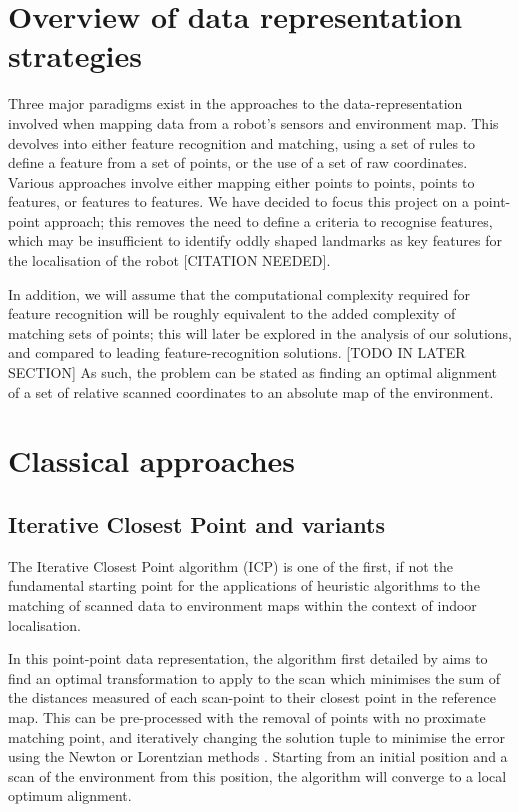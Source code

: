 \documentclass[authoryearcitations]{UoYCSproject}
\begin{document}
\section{Overview of data representation strategies}
Three major paradigms exist in the approaches to the data-representation involved when mapping data from a robot's sensors and environment map. This devolves into either feature recognition and matching, using a set of rules to define a feature from a set of points, or the use of a set of raw coordinates. Various approaches involve either mapping either points to points, points to features, or features to features. We have decided to focus this project on a point-point approach; this removes the need to define a criteria to recognise features, which may be insufficient to identify oddly shaped landmarks as key features for the localisation of the robot [CITATION NEEDED]. 

In addition, we will assume that the computational complexity required for feature recognition will be roughly equivalent to the added complexity of matching sets of points; this will later be explored in the analysis of our solutions, and compared to leading feature-recognition solutions. [TODO IN LATER SECTION] As such, the problem can be stated as finding an optimal alignment of a set of relative scanned coordinates to an absolute map of the environment. 



\section{Classical approaches}
\subsection{Iterative Closest Point and variants}

The Iterative Closest Point algorithm (ICP) is one of the first, if not the fundamental starting point for the applications of heuristic algorithms to the matching of scanned data to environment maps within the context of indoor localisation.

In this point-point data representation, the algorithm first detailed by \citet{Besl1992-pd} aims to find an optimal transformation to apply to the scan which minimises the sum of the distances measured of each scan-point to their closest point in the reference map. This can be pre-processed with the removal of points with no proximate matching point, and iteratively changing the solution tuple to minimise the error using the Newton or Lorentzian methods \cite{Munoz2005-gt}. Starting from an initial position and a scan of the environment from this position, the algorithm will converge to a local optimum alignment. 
\end{document}
